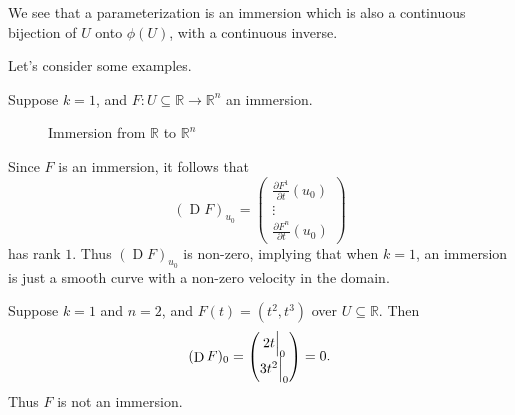 \documentclass[notoc,notitlepage]{tufte-book}
\DeclareMathOperator{\D}{D}
\begin{document}
\begin{note}
  We see that a parameterization is an immersion which is also a continuous
  bijection of $U$ onto $\phi(U)$, with a continuous inverse.
\end{note}

Let's consider some examples.

\begin{eg}
  Suppose $k = 1$, and $F : U \subseteq \mathbb{R} \to \mathbb{R}^n$ an
  immersion.
  \begin{figure}[ht]
    \centering
    \caption{Immersion from $\mathbb{R}$ to $\mathbb{R}^n$}
    \label{fig:immersion_from_r_to_r_n_}
  \end{figure}

  Since $F$ is an immersion, it follows that
  \begin{equation*}
    (\D F)_{u_0} = \begin{pmatrix}
      \frac{\partial F^1}{\partial t}(u_0) \\
      \vdots \\
      \frac{\partial F^n}{\partial t}(u_0)
    \end{pmatrix}
  \end{equation*}
  has rank $1$. Thus $(\D F)_{u_0}$ is non-zero, implying that when $k =
  1$, an immersion is just a smooth curve with a non-zero velocity in the
  domain.
\end{eg}

\begin{eg}
  Suppose $k = 1$ and $n = 2$, and $F(t) = (t^2, t^3)$ over $U \subseteq
  \mathbb{R}$. Then
  \begin{equation*}
    (\D F)_0 = \begin{pmatrix}
      2t \at{0}{} \\ 3t^2 \at{0}{}
    \end{pmatrix} = 0.
  \end{equation*}
  Thus $F$ is not an immersion.
\end{eg}
\end{document}
